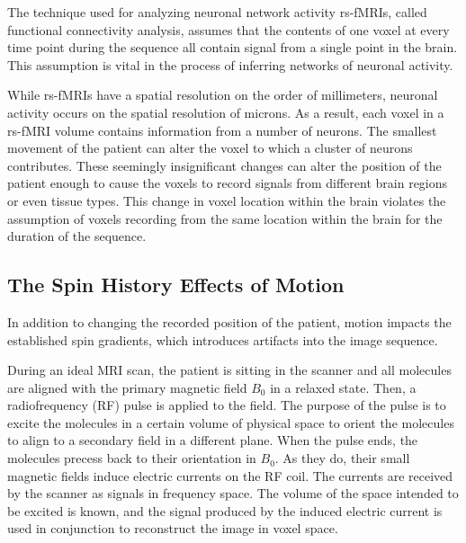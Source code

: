 The technique used for analyzing neuronal network activity rs-fMRIs, called functional connectivity analysis, assumes that the contents of one voxel at every time point during the sequence all contain signal from a single point in the brain. This assumption is vital in the process of inferring networks of neuronal activity. 

While rs-fMRIs have a spatial resolution on the order of millimeters, neuronal activity occurs on the spatial resolution of microns. As a result, each voxel in a rs-fMRI volume contains information from a number of neurons. The smallest movement of the patient can alter the voxel to which a cluster of neurons contributes. These seemingly insignificant changes can alter the position of the patient enough to cause the voxels to record signals from different brain regions or even tissue types. This change in voxel location within the brain violates the assumption of voxels recording from the same location within the brain for the duration of the sequence.


\subsection{The Spin History Effects of Motion}

In addition to changing the recorded position of the patient, motion impacts the established spin gradients, which introduces artifacts into the image sequence.


During an ideal MRI scan, the patient is sitting in the scanner and all molecules are aligned with the primary magnetic field $B_0$ in a relaxed state. Then, a radiofrequency (RF) pulse is applied to the field. The purpose of the pulse is to excite the molecules in a certain volume of physical space to orient the molecules to align to a secondary field in a different plane. When the pulse ends, the molecules precess back to their orientation in $B_0$. As they do, their small magnetic fields induce electric currents on the RF coil. The currents are received by the scanner as signals in frequency space. The volume of the space intended to be excited is known, and the signal produced by the induced electric current is used in conjunction to reconstruct the image in voxel space.

